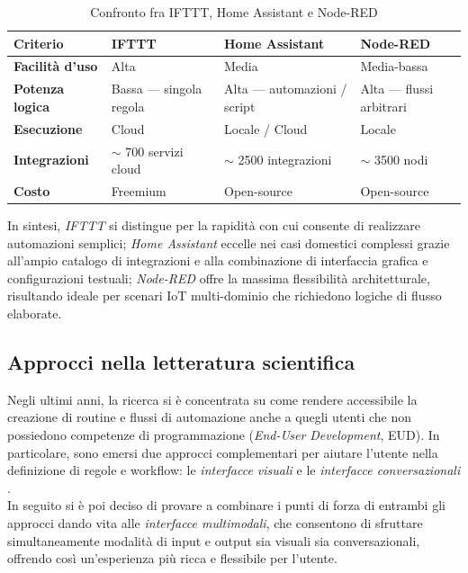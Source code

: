 \begin{table}[H]
  \centering
  \renewcommand{\arraystretch}{1.4}  %
  \begin{tabular}{|C{0.20\textwidth}|C{0.2\textwidth}|C{0.25\textwidth}|C{0.2\textwidth}|}
    \hline
    \textbf{Criterio} & \textbf{IFTTT} & \textbf{Home Assistant} & \textbf{Node-RED} \\ \hline
    \textbf{Facilità d’uso}    & Alta                   & Media           & Media-bassa \\ \hline
    \textbf{Potenza logica}    & Bassa –– singola regola      & Alta –– automazioni / script & Alta –– flussi arbitrari \\ \hline
    \textbf{Esecuzione}        & Cloud                        & Locale / Cloud              & Locale \\ \hline
    \textbf{Integrazioni}      & $\sim$ 700 servizi cloud      & $\sim$ 2500 integrazioni      & $\sim$ 3500 nodi \\ \hline
    \textbf{Costo}             & Freemium                     & Open-source                  & Open-source \\ \hline
  \end{tabular}
  \caption{Confronto fra IFTTT, Home Assistant e Node-RED}
  \label{tab:confronto_piattaforme}
\end{table}



In sintesi, \emph{IFTTT} si distingue per la rapidità con cui consente di realizzare automazioni semplici; \emph{Home Assistant} eccelle nei casi domestici complessi grazie all’ampio catalogo di integrazioni e alla combinazione di interfaccia grafica e configurazioni testuali; \emph{Node-RED} offre la massima flessibilità architetturale, risultando ideale per scenari IoT multi-dominio che richiedono logiche di flusso elaborate.





\subsection{Approcci nella letteratura scientifica}
Negli ultimi anni, la ricerca si è concentrata su come rendere accessibile la creazione di routine e flussi di automazione anche a quegli utenti che non possiedono competenze di programmazione (\textit{End-User Development}, EUD). In particolare, sono emersi due approcci complementari per aiutare l’utente nella definizione di regole e workflow: le \emph{interfacce visuali} e le \emph{interfacce conversazionali} \cite{Barricelli2024}. \\
In seguito si è poi deciso di provare a combinare i punti di forza di entrambi gli approcci dando vita alle \emph{interfacce multimodali}, che consentono di sfruttare simultaneamente modalità di input e output sia visuali sia conversazionali, offrendo così un’esperienza più ricca e flessibile per l’utente.


